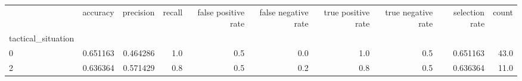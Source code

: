 \begin{tabular}{lrrrrrrrrr}
\toprule
{} &  accuracy &  precision &  recall &  false positive rate &  false negative rate &  true positive rate &  true negative rate &  selection rate &  count \\
tactical\_situation &           &            &         &                      &                      &                     &                     &                 &        \\
\midrule
0                  &  0.651163 &   0.464286 &     1.0 &                  0.5 &                  0.0 &                 1.0 &                 0.5 &        0.651163 &   43.0 \\
2                  &  0.636364 &   0.571429 &     0.8 &                  0.5 &                  0.2 &                 0.8 &                 0.5 &        0.636364 &   11.0 \\
\bottomrule
\end{tabular}
